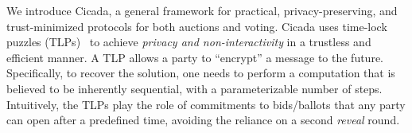 We introduce Cicada, a general framework for practical, privacy-preserving, and trust-minimized protocols for both auctions and voting. 
Cicada uses time-lock puzzles (TLPs)~\cite{RivShaWag96} to achieve \emph{privacy and non-interactivity} in a trustless and efficient manner.
A TLP allows a party to ``encrypt'' a message to the future. Specifically, to recover the solution, one needs to perform a computation that is believed to be inherently sequential, with a parameterizable number of steps.
Intuitively, the TLPs play the role of commitments to bids/ballots that any party can open after a predefined time, avoiding the reliance on a second \emph{reveal} round. 



